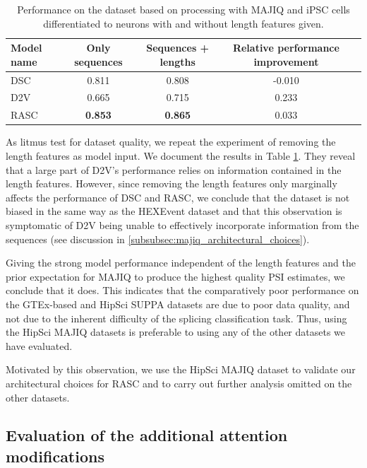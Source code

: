 \begin{table}[h!]
	\centering
	\begin{tabular}{| l | c | c | c| c} 
		\hline
		Model name & Only sequences & Sequences + lengths & Relative performance improvement\\
		\hline
		DSC & 0.811 & 0.808 & -0.010\\
		D2V & 0.665 & 0.715 & 0.233\\
		RASC & \textbf{0.853} & \textbf{0.865} & 0.033\\
		\hline
	\end{tabular}
	\caption{Performance on the dataset based on processing with MAJIQ and iPSC cells differentiated to neurons with and without length features given. 
	}
	\label{table:majiq_nolens}
\end{table}

As litmus test for dataset quality, we repeat the experiment of removing the length features as model input. We document the results in Table \ref{table:majiq_nolens}.
They reveal that a large part of D2V's performance relies on information contained in the length features. However, since removing the length features only marginally affects the performance of DSC and RASC, we conclude that the dataset is not biased in the same way as the HEXEvent dataset and that this observation is symptomatic of D2V being unable to effectively incorporate information from the sequences (see discussion in \ref{subsubsec:majiq_architectural_choices}). 

Giving the strong model performance independent of the length features and the prior expectation for MAJIQ to produce the highest quality PSI estimates, we conclude that it does. This indicates that the comparatively poor performance on the GTEx-based and HipSci SUPPA datasets are due to poor data quality, and not due to the inherent difficulty of the splicing classification task. Thus, using the HipSci MAJIQ datasets is preferable to using any of the other datasets we have evaluated. 

Motivated by this observation, we use the HipSci MAJIQ dataset to validate our architectural choices for RASC and to carry out further analysis omitted on the other datasets.





\subsection{Evaluation of the additional attention modifications} \label{subsubsec:attn_hyperparams}

